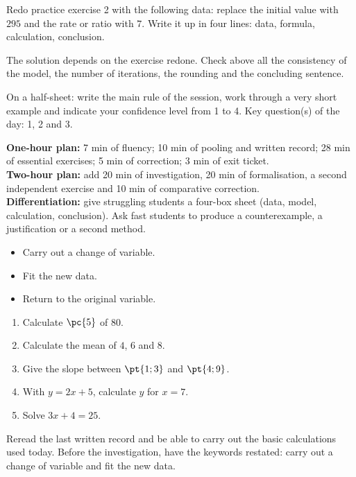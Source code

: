 
\begin{homework}Redo practice exercise 2 with the following data: replace the initial value with $295$ and the rate or ratio with $7$. Write it up in four lines: data, formula, calculation, conclusion.\end{homework}
\begin{solution}The solution depends on the exercise redone. Check above all the consistency of the model, the number of iterations, the rounding and the concluding sentence.\end{solution}

\begin{exitticket}[3 minutes]On a half-sheet: write the main rule of the session, work through a very short example and indicate your confidence level from 1 to 4. Key question(s) of the day: 1, 2 and 3.\end{exitticket}

\ifmxteacher
\begin{method}
\textbf{One-hour plan:} 7 min of fluency; 10 min of pooling and written record; 28 min of essential exercises; 5 min of correction; 3 min of exit ticket.\\
\textbf{Two-hour plan:} add 20 min of investigation, 20 min of formalisation, a second independent exercise and 10 min of comparative correction.\\
\textbf{Differentiation:} give struggling students a four-box sheet (data, model, calculation, conclusion). Ask fast students to produce a counterexample, a justification or a second method.
\end{method}
\fi
{}
\begin{objectives}\begin{itemize}\item Carry out a change of variable.\item Fit the new data.\item Return to the original variable.\end{itemize}\end{objectives}
\begin{fluency}\begin{enumerate}\item Calculate $\pc{5}$ of $80$. \item Calculate the mean of $4$, $6$ and $8$. \item Give the slope between $\pt{1;3}$ and $\pt{4;9}$. \item With $y=2x+5$, calculate $y$ for $x=7$. \item Solve $3x+4=25$. \end{enumerate}\end{fluency}
\begin{prerequisites}Reread the last written record and be able to carry out the basic calculations used today. Before the investigation, have the keywords restated: carry out a change of variable and fit the new data.\end{prerequisites}

